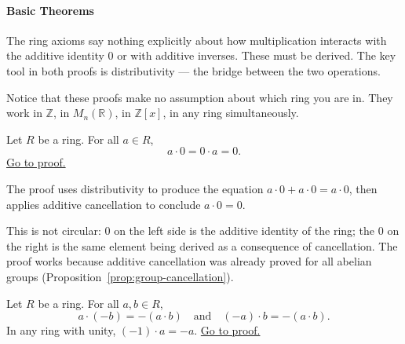 \paragraph{Basic Theorems}

\begin{remark}
The ring axioms say nothing explicitly about how multiplication
interacts with the additive identity $0$ or with additive inverses.
These must be derived. The key tool in both proofs is distributivity
--- the bridge between the two operations.

Notice that these proofs make no assumption about which ring you are in.
They work in $\mathbb{Z}$, in $M_n(\mathbb{R})$, in $\mathbb{Z}[x]$,
in any ring simultaneously.
\end{remark}

\begin{proposition}
\label{prop:ring-mult-zero}
Let $R$ be a ring. For all $a \in R$,
\[
a \cdot 0 = 0 \cdot a = 0.
\]
\hyperref[prf:ring-mult-zero]{Go to proof.}
\end{proposition}

\begin{remark*}
\end{remark*}



\begin{remark}
The proof uses distributivity to produce the equation
$a \cdot 0 + a \cdot 0 = a \cdot 0$, then applies additive
cancellation to conclude $a \cdot 0 = 0$.

This is not circular: $0$ on the left side is the additive identity
of the ring; the $0$ on the right is the same element being derived
as a consequence of cancellation. The proof works because additive
cancellation was already proved for all abelian groups
(Proposition~\ref{prop:group-cancellation}).
\end{remark}

\begin{proposition}
\label{prop:ring-mult-neg}
Let $R$ be a ring. For all $a, b \in R$,
\[
a \cdot (-b) = -(a \cdot b)
\quad\text{and}\quad
(-a) \cdot b = -(a \cdot b).
\]
In any ring with unity, $(-1) \cdot a = -a$.
\hyperref[prf:ring-mult-neg]{Go to proof.}
\end{proposition}

